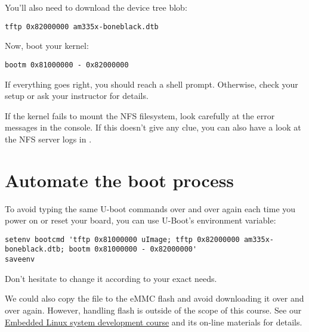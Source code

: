 You'll also need to download the device tree blob:

\begin{verbatim}
tftp 0x82000000 am335x-boneblack.dtb
\end{verbatim}

Now, boot your kernel:

\begin{verbatim}
bootm 0x81000000 - 0x82000000
\end{verbatim}

If everything goes right, you should reach a shell prompt. Otherwise,
check your setup or ask your instructor for details.

If the kernel fails to mount the NFS filesystem, look carefully at the
error messages in the console. If this doesn't give any clue, you can
also have a look at the NFS server logs in .

\section{Automate the boot process}

To avoid typing the same U-boot commands over and over again each time
you power on or reset your board, you can use U-Boot's 
environment variable:

{\scriptsize
\begin{verbatim}
setenv bootcmd 'tftp 0x81000000 uImage; tftp 0x82000000 am335x-boneblack.dtb; bootm 0x81000000 - 0x82000000'
saveenv
\end{verbatim}
}

Don't hesitate to change it according to your exact needs.

We could also copy the  file to the eMMC flash and avoid
downloading it over and over again. However, handling flash is outside
of the scope of this course. See our
\href{http://free-electrons.com/training/embedded-linux/}{Embedded
Linux system development course} and its on-line materials for
details.

